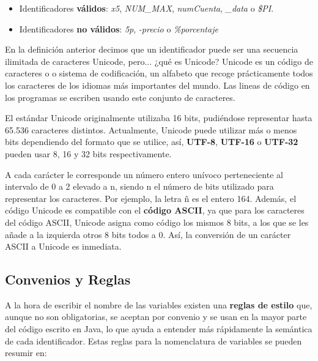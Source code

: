 \begin{itemize}
    \item Identificadores \textbf{válidos}: \textit{x5}, \textit{NUM\_MAX}, \textit{numCuenta}, \textit{\_data} o \textit{\$PI}.
    \item Identificadores \textbf{no válidos}: \textit{5p}, \textit{-precio} o \textit{\%porcentaje}
\end{itemize}

En la definición anterior decimos que un identificador puede ser una secuencia ilimitada de caracteres Unicode, pero... ¿qué es Unicode? Unicode es un código de caracteres o o sistema de codificación, un alfabeto que recoge prácticamente todos los caracteres de los idiomas más importantes del mundo. Las lineas de código en los programas se escriben usando este conjunto de caracteres.

El estándar Unicode originalmente utilizaba 16 bits, pudiéndose representar hasta 65.536 caracteres distintos. Actualmente, Unicode puede utilizar más o menos bits dependiendo del formato que se utilice, así, \textbf{UTF-8}, \textbf{UTF-16} o \textbf{UTF-32} pueden usar 8, 16 y 32 bits respectivamente.

A cada carácter le corresponde un número entero unívoco perteneciente al intervalo de 0 a 2 elevado a n, siendo n el número de bits utilizado para representar los caracteres. Por ejemplo, la letra ñ es el entero 164. Además, el código Unicode es compatible con el \textbf{código ASCII}, ya que para los caracteres del código ASCII, Unicode asigna como código los mismos 8 bits, a los que se les añade a la izquierda otros 8 bits todos a 0. Así, la conversión de un carácter ASCII a Unicode es inmediata.

\subsection{Convenios y Reglas}
A la hora de escribir el nombre de las variables existen una \textbf{reglas de estilo} que, aunque no son obligatorias, se aceptan por convenio y se usan en la mayor parte del código escrito en Java, lo que ayuda a entender más rápidamente la semántica de cada identificador. Estas reglas para la nomenclatura de variables se pueden resumir en:

